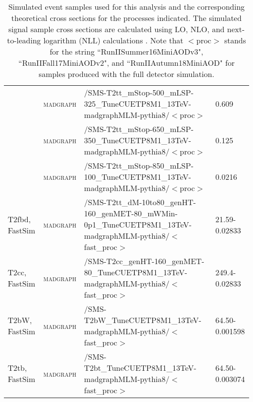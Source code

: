 \begin{table}[!htp]
\begin{center}
{\begin{tabular}{|l|l|l|l|}
     & \textsc{madgraph} & /SMS-T2tt\_mStop-500\_mLSP-325\_TuneCUETP8M1\_13TeV-madgraphMLM-pythia8/$<$proc$>$ & 0.609 \\
     & \textsc{madgraph} & /SMS-T2tt\_mStop-650\_mLSP-350\_TuneCUETP8M1\_13TeV-madgraphMLM-pythia8/$<$proc$>$ & 0.125 \\
     & \textsc{madgraph} & /SMS-T2tt\_mStop-850\_mLSP-100\_TuneCUETP8M1\_13TeV-madgraphMLM-pythia8/$<$proc$>$ & 0.0216 \\
\hline
T2fbd, FastSim & \textsc{madgraph} & /SMS-T2tt\_dM-10to80\_genHT-160\_genMET-80\_mWMin-0p1\_TuneCUETP8M1\_13TeV-madgraphMLM-pythia8/$<$fast\_proc$>$ & 21.59-0.02833 \\
T2cc, FastSim & \textsc{madgraph} & /SMS-T2cc\_genHT-160\_genMET-80\_TuneCUETP8M1\_13TeV-madgraphMLM-pythia8/$<$fast\_proc$>$ & 249.4-0.02833 \\
T2bW, FastSim & \textsc{madgraph} & /SMS-T2bW\_TuneCUETP8M1\_13TeV-madgraphMLM-pythia8/$<$fast\_proc$>$ & 64.50-0.001598 \\
T2tb, FastSim & \textsc{madgraph} & /SMS-T2bt\_TuneCUETP8M1\_13TeV-madgraphMLM-pythia8/$<$fast\_proc$>$ & 64.50-0.003074 \\
\hline
\end{tabular}
}
\end{center}
\caption[Signal Samples]{\label{tab:signals}Simulated event samples used for this analysis and the corresponding theoretical cross sections for the processes indicated. The simulated signal sample cross sections are calculated using LO, NLO, and next-to-leading logarithm (NLL) calculations \cite{borschensky_squark_2014}. Note that $<$proc$>$ stands for the string ``RunIISummer16MiniAODv3", ``RunIIFall17MiniAODv2", and ``RunIIAutumn18MiniAOD" for samples produced with the full detector simulation.}
\end{table}
